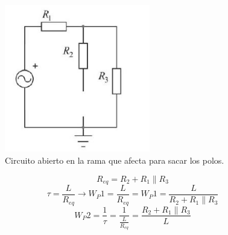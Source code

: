 \documentclass[12pt]{report}
\begin{document}
\begin{figure}[h!]
  \centering
    \includegraphics[width=2.5in]{parte3}
  \caption{Circuito abierto en la rama que afecta  para sacar los polos.}
\end{figure}
\begin{equation*}
R_{eq}=R_2+R_1 \parallel R_3
\end{equation*}
\begin{equation*}
\tau=\frac{L}{R_{eq}} \rightarrow W_P1=\frac{L}{R_{eq}}= W_P1=\frac{L}{R_2+R_1 \parallel R_3}
\end{equation*}
\begin{equation*}
W_P2=\frac{1}{\tau}=\frac{1}{\frac{L}{R_{eq}}}=\frac{R_2+R_1 \parallel R_3}{L}
\end{equation*}
\end{document}
